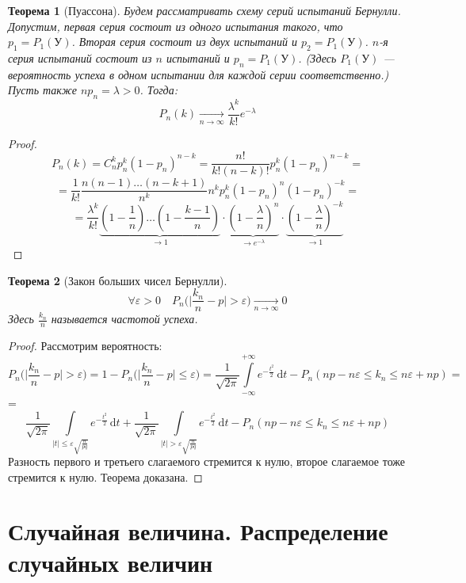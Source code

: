 \documentclass[11pt,openany,a4paper]{scrartcl}
\theoremstyle{plain}
\newtheorem{theorem}{Теорема}[section]
\theoremstyle{definition}
\newcommand{\underto}[1]{\xrightarrow[#1]{}}
\newcommand{\dif}{\, \mathrm d}
\begin{document}
\begin{theorem}[Пуассона]
    Будем рассматривать схему серий испытаний Бернулли. Допустим, первая серия 
    состоит из одного испытания такого, что $p_1 = P_1(У)$. Вторая серия
    состоит из двух испытаний и $p_2 = P_1(У)$.
    $n$-я серия испытаний состоит из $n$ испытаний и $p_n = P_1(У)$.
    (Здесь $P_1(У)$ — вероятность успеха в одном испытании для каждой серии 
    соответственно.)
    Пусть также $np_n = \lambda > 0$. Тогда:
    $$
    P_n(k) \underto{n \to \infty} \frac{\lambda^k}{k!}e^{-\lambda}
    $$
\end{theorem}
\begin{proof}
    $$
    P_n(k) = C_n^k p_n^k(1 - p_n)^{n-k} = \frac{n!}{k!(n-k)!}p_n^k(1-p_n)^{n-k} =
    $$
    $$
    = \frac{1}{k!} \frac{n(n-1)\ldots(n-k+1)}{n^k} n^k
    p_n^k(1-p_n)^n(1-p_n)^{-k} =
    $$
    $$
    = \frac{\lambda^k}{k!}
    \underbrace{(1 - \frac{1}{n})\ldots(1 - \frac{k-1}{n})}_{\to 1} \cdot
    \underbrace{(1 - \frac{\lambda}{n})^n}_{\to e^{-\lambda}}\cdot
    \underbrace{(1 - \frac{\lambda}{n})^{-k}}_{\to 1}    
    $$
\end{proof}

\begin{theorem}[Закон больших чисел Бернулли]
    $$
    \forall \varepsilon > 0\quad P_n\bigg(\bigg|\frac{k_n}{n} -
    p\bigg| > \varepsilon\bigg)
    \underto{n \to \infty} 0
    $$
    Здесь $\frac{k_n}{n}$ называется частотой успеха.
\end{theorem}
\begin{proof}
    Рассмотрим вероятность:
    $$
    P_n\big(\big|\frac{k_n}{n} -
    p\big| > \varepsilon\big) = 1 - P_n(\big|\frac{k_n}{n} -
    p\big| \leqslant \varepsilon\big) =
    \frac{1}{\sqrt{2\pi}}
    \int\limits_{-\infty}^{+\infty}e^{-\frac{t^2}{2}} \dif t -
    P_n(np - n\varepsilon \leqslant k_n \leqslant n\varepsilon + np) =
    $$
    = $$
    \frac{1}{\sqrt{2\pi}}
    \int\limits_{|t|\leqslant \varepsilon \sqrt{\frac{n}{pq}}}
    e^{-\frac{t^2}{2}} \dif t + \frac{1}{\sqrt{2\pi}}
    \int\limits_{|t| > \varepsilon \sqrt{\frac{n}{pq}}}
    e^{-\frac{t^2}{2}} \dif t -
    P_n(np - n\varepsilon \leqslant k_n \leqslant n\varepsilon + np)
    $$
    Разность первого и третьего слагаемого стремится к нулю, второе слагаемое тоже
    стремится к нулю. Теорема доказана.
\end{proof}

\section{Случайная величина. Распределение случайных величин}
\end{document}
